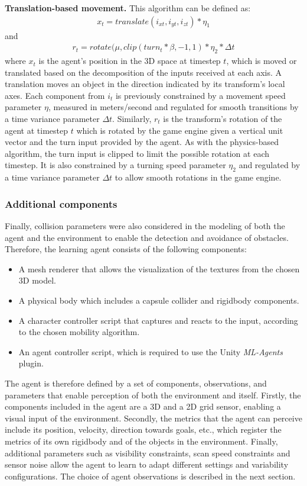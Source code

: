 \textbf{Translation-based movement.}
This algorithm can be defined as:
\begin{align*}
    x_t = translate(i_{xt}, i_{yt}, i_{zt}) * \eta_1
\end{align*}
and
\begin{align*}
    r_t = rotate(\mu, clip(turn_t * \beta, -1, 1) * \eta_2 * \Delta t
\end{align*}
where $x_t$ is the agent's position in the 3D space at timestep $t$, which is moved or translated based on the decomposition of the inputs received at each axis. A translation moves an object in the direction indicated by its transform's local axes. Each component from $i_t$ is previously constrained by a movement speed parameter $\eta$, measured in meters/second and regulated for smooth transitions by a time variance parameter $\Delta t$. 
Similarly, $r_t$ is the transform's rotation of the agent at timestep $t$ which is rotated by the game engine given a vertical unit vector and the turn input provided by the agent. As with the physics-based algorithm, the turn input is clipped to limit the possible rotation at each timestep. It is also constrained by a turning speed parameter $\eta_2$ and regulated by a time variance parameter $\Delta t$ to allow smooth rotations in the game engine.


\subsubsection{Additional components} 
Finally, collision parameters were also considered in the modeling of both the agent and the environment to enable the detection and avoidance of obstacles.
Therefore, the learning agent consists of the following components:
\begin{itemize}
    \item A mesh renderer that allows the visualization of the textures from the chosen 3D model.
    \item A physical body which includes a capsule collider and rigidbody components.
    \item A character controller script that captures and reacts to the input, according to the chosen mobility algorithm.
    \item An agent controller script, which is required to use the Unity \textit{ML-Agents} plugin.
\end{itemize}

The agent is therefore defined by a set of components, observations, and parameters that enable perception of both the environment and itself. 
Firstly, the components included in the agent are a 3D and a 2D grid sensor, enabling a visual input of the environment. 
Secondly, the metrics that the agent can perceive include its position, velocity, direction towards goals, etc., which register the metrics of its own rigidbody and of the objects in the environment. Finally, additional parameters such as visibility constraints, scan speed constraints and sensor noise allow the agent to learn to adapt different settings and variability configurations.
The choice of agent observations is described in the next section.

